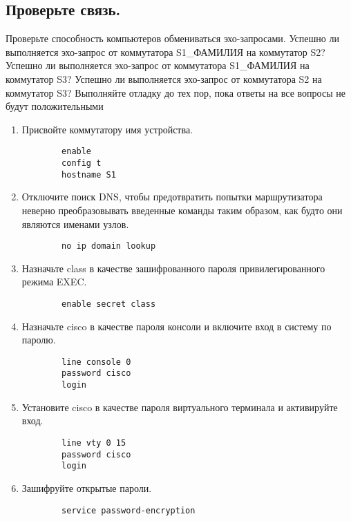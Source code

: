 \subsection{Проверьте связь.}
Проверьте способность компьютеров обмениваться эхо-запросами.
Успешно ли выполняется эхо-запрос от коммутатора S1_ФАМИЛИЯ на
коммутатор S2? Успешно ли выполняется эхо-запрос от коммутатора
S1_ФАМИЛИЯ на коммутатор S3? Успешно ли выполняется эхо-запрос от
коммутатора S2 на коммутатор S3?
Выполняйте отладку до тех пор, пока ответы на все вопросы не будут положительными

\begin{enumerate}[a]
    \item Присвойте коммутатору имя устройства.
    \begin{verbatim}
        enable
        config t
        hostname S1
    \end{verbatim}

    \item Отключите поиск DNS, чтобы предотвратить попытки маршрутизатора неверно преобразовывать
    введенные команды таким образом, как будто они являются именами узлов.
    \begin{verbatim}
        no ip domain lookup
    \end{verbatim}

    \item Назначьте class в качестве зашифрованного пароля привилегированного режима EXEC\@.
    \begin{verbatim}
        enable secret class
    \end{verbatim}

    \item Назначьте cisco в качестве пароля консоли и включите вход в систему по паролю.
    \begin{verbatim}
        line console 0
        password cisco
        login
    \end{verbatim}

    \item Установите cisco в качестве пароля виртуального терминала и активируйте вход.
    \begin{verbatim}
        line vty 0 15
        password cisco
        login
    \end{verbatim}

    \item Зашифруйте открытые пароли.
    \begin{verbatim}
        service password-encryption
    \end{verbatim}


\end{enumerate}
